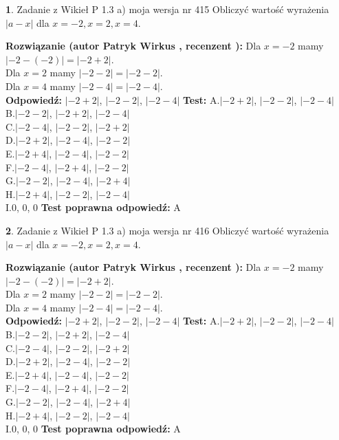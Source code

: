 \documentclass[12pt, a4paper]{article}
\theoremstyle{definition} %
\newtheorem{zad}{}
\newcommand{\zadStart}[1]{\begin{zad}#1\newline}
\newcommand{\zadStop}{\end{zad}}
\newcommand{\rozwStart}[2]{\noindent \textbf{Rozwiązanie (autor #1 , recenzent #2): }\newline}
\newcommand{\rozwStop}{\newline}
\newcommand{\odpStart}{\noindent \textbf{Odpowiedź:}\newline}
\newcommand{\odpStop}{\newline}
\newcommand{\testStart}{\noindent \textbf{Test:}\newline}
\newcommand{\testStop}{\newline}
\newcommand{\kluczStart}{\noindent \textbf{Test poprawna odpowiedź:}\newline}
\newcommand{\kluczStop}{\newline}
\begin{document}
\zadStart{Zadanie z Wikieł P 1.3 a) moja wersja nr 415}
Obliczyć wartość wyrażenia $|a - x|$ dla $x=-2,x=2,x=4$.
\zadStop
\rozwStart{Patryk Wirkus}{}
Dla $x = -2$ mamy $|-2 - (-2)| = |-2 + 2|$.\\
Dla $x = 2$ mamy $|-2 - 2| = |-2 - 2|$.\\
Dla $x = 4$ mamy $|-2 - 4| = |-2 - 4|$.\\
\rozwStop
\odpStart
$|-2 + 2|$, $|-2 - 2|$, $|-2 - 4|$
\odpStop
\testStart
A.$|-2 + 2|$, $|-2 - 2|$, $|-2 - 4|$\\
B.$|-2 - 2|$, $|-2 + 2|$, $|-2 - 4|$\\
C.$|-2 - 4|$, $|-2 - 2|$, $|-2 + 2|$\\
D.$|-2 + 2|$, $|-2 - 4|$, $|-2 - 2|$\\
E.$|-2 + 4|$, $|-2 - 4|$, $|-2 - 2|$\\
F.$|-2 - 4|$, $|-2 + 4|$, $|-2 - 2|$\\
G.$|-2 - 2|$, $|-2 - 4|$, $|-2 + 4|$\\
H.$|-2 + 4|$, $|-2 - 2|$, $|-2 - 4|$\\
I.$0$, $0$, $0$
\testStop
\kluczStart
A
\kluczStop



\zadStart{Zadanie z Wikieł P 1.3 a) moja wersja nr 416}
Obliczyć wartość wyrażenia $|a - x|$ dla $x=-2,x=2,x=4$.
\zadStop
\rozwStart{Patryk Wirkus}{}
Dla $x = -2$ mamy $|-2 - (-2)| = |-2 + 2|$.\\
Dla $x = 2$ mamy $|-2 - 2| = |-2 - 2|$.\\
Dla $x = 4$ mamy $|-2 - 4| = |-2 - 4|$.\\
\rozwStop
\odpStart
$|-2 + 2|$, $|-2 - 2|$, $|-2 - 4|$
\odpStop
\testStart
A.$|-2 + 2|$, $|-2 - 2|$, $|-2 - 4|$\\
B.$|-2 - 2|$, $|-2 + 2|$, $|-2 - 4|$\\
C.$|-2 - 4|$, $|-2 - 2|$, $|-2 + 2|$\\
D.$|-2 + 2|$, $|-2 - 4|$, $|-2 - 2|$\\
E.$|-2 + 4|$, $|-2 - 4|$, $|-2 - 2|$\\
F.$|-2 - 4|$, $|-2 + 4|$, $|-2 - 2|$\\
G.$|-2 - 2|$, $|-2 - 4|$, $|-2 + 4|$\\
H.$|-2 + 4|$, $|-2 - 2|$, $|-2 - 4|$\\
I.$0$, $0$, $0$
\testStop
\kluczStart
A
\kluczStop
\end{document}
